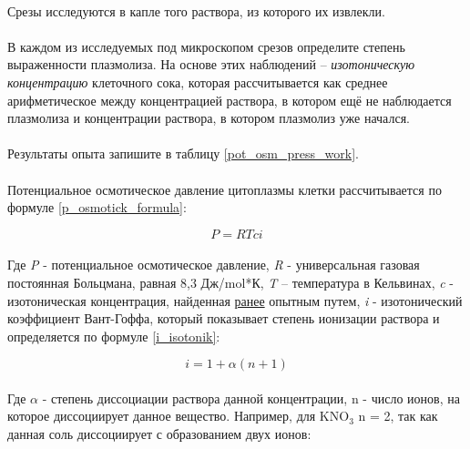 \paragraph*{\warningsign}Срезы исследуются в капле того раствора, из которого их извлекли.

\paragraph*{}В каждом из исследуемых под микроскопом срезов определите степень выраженности плазмолиза. На основе этих наблюдений -- \textit{\hypertarget{c_isitonik}{изотоническую концентрацию}} клеточного сока, которая рассчитывается как среднее арифметическое между концентрацией раствора, в котором ещё не наблюдается плазмолиза и концентрации раствора, в котором плазмолиз уже начался.

\paragraph*{}Результаты опыта запишите в таблицу \ref{pot_osm_press_work}.

\paragraph*{}Потенциальное осмотическое давление цитоплазмы клетки рассчитывается по формуле \ref{p_osmotick_formula}:

\begin{equation}
\label{p_osmotick_formula}
	P = RTci
\end{equation}

\paragraph*{}Где \textit{P} - потенциальное осмотическое давление, \textit{R} - универсальная газовая постоянная Больцмана, равная 8,3 Дж/\gls{mol}*К, \textit{T} -- температура в Кельвинах, \textit{c} - изотоническая концентрация, найденная \hyperlink{c_isitonik}{ранее} опытным путем, \textit{i} - изотонический коэффициент Вант-Гоффа, который показывает степень ионизации раствора и определяется по формуле \ref{i_isotonik}:

\begin{equation}
	\label{i_isotonik}
	i = 1 + \alpha(n + 1)
\end{equation}

\paragraph*{}Где $\alpha$ - степень диссоциации раствора данной концентрации, n - число ионов, на которое диссоциирует данное вещество. Например, для KNO$_3$ n = 2, так как данная соль диссоциирует с образованием двух ионов:

